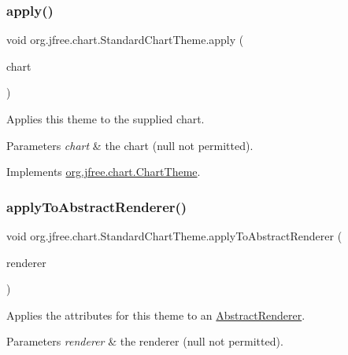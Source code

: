 \subsubsection{\texorpdfstring{apply()}{apply()}}
{\footnotesize\ttfamily void org.\+jfree.\+chart.\+Standard\+Chart\+Theme.\+apply (\begin{DoxyParamCaption}\item[{\mbox{\hyperlink{classorg_1_1jfree_1_1chart_1_1_j_free_chart}{J\+Free\+Chart}}}]{chart }\end{DoxyParamCaption})}

Applies this theme to the supplied chart.


\begin{DoxyParams}{Parameters}
{\em chart} & the chart ({\ttfamily null} not permitted). \\
\hline
\end{DoxyParams}


Implements \mbox{\hyperlink{interfaceorg_1_1jfree_1_1chart_1_1_chart_theme_a7e7055b6ed699dbd041616193a410bd6}{org.\+jfree.\+chart.\+Chart\+Theme}}.

\mbox{\label{classorg_1_1jfree_1_1chart_1_1_standard_chart_theme_a2c51b14e868c9077144b31845c157ad2}} 
\subsubsection{\texorpdfstring{apply\+To\+Abstract\+Renderer()}{applyToAbstractRenderer()}}
{\footnotesize\ttfamily void org.\+jfree.\+chart.\+Standard\+Chart\+Theme.\+apply\+To\+Abstract\+Renderer (\begin{DoxyParamCaption}\item[{\mbox{\hyperlink{classorg_1_1jfree_1_1chart_1_1renderer_1_1_abstract_renderer}{Abstract\+Renderer}}}]{renderer }\end{DoxyParamCaption})\hspace{0.3cm}{\ttfamily [protected]}}

Applies the attributes for this theme to an \mbox{\hyperlink{}{Abstract\+Renderer}}.


\begin{DoxyParams}{Parameters}
{\em renderer} & the renderer ({\ttfamily null} not permitted). \\
\hline
\end{DoxyParams}
\mbox{\label{classorg_1_1jfree_1_1chart_1_1_standard_chart_theme_aff9fc6c6abedb681e6dfd224b2cb7a66}} 
